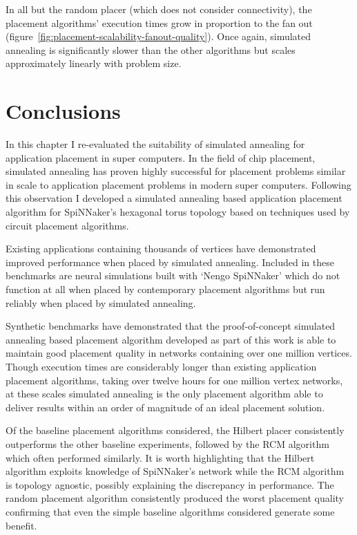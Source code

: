 				In all but the random placer (which does not consider connectivity),
				the placement algorithms' execution times grow in proportion to the fan
				out (figure~\ref{fig:placement-scalability-fanout-quality}). Once
				again, simulated annealing is significantly slower than the other
				algorithms but scales approximately linearly with problem size.
	
	\section{Conclusions}
		
		In this chapter I re-evaluated the suitability of simulated annealing for
		application placement in super computers. In the field of chip placement,
		simulated annealing has proven highly successful for placement problems
		similar in scale to application placement problems in modern super
		computers. Following this observation I developed a simulated annealing
		based application placement algorithm for SpiNNaker's hexagonal torus
		topology based on techniques used by circuit placement algorithms.
		
		Existing applications containing thousands of vertices have demonstrated
		improved performance when placed by simulated annealing. Included in these
		benchmarks are neural simulations built with `Nengo SpiNNaker' which do not
		function at all when placed by contemporary placement algorithms but run
		reliably when placed by simulated annealing.
		
		Synthetic benchmarks have demonstrated that the proof-of-concept simulated
		annealing based placement algorithm developed as part of this work is able
		to maintain good placement quality in networks containing over one million
		vertices. Though execution times are considerably longer than existing
		application placement algorithms, taking over twelve hours for one million
		vertex networks, at these scales simulated annealing is the only placement
		algorithm able to deliver results within an order of magnitude of an ideal
		placement solution.
		
		Of the baseline placement algorithms considered, the Hilbert placer
		consistently outperforms the other baseline experiments, followed by the
		RCM algorithm which often performed similarly. It is worth highlighting
		that the Hilbert algorithm exploits knowledge of SpiNNaker's network while
		the RCM algorithm is topology agnostic, possibly explaining the discrepancy
		in performance. The random placement algorithm consistently produced the
		worst placement quality confirming that even the simple baseline algorithms
		considered generate some benefit.
		
